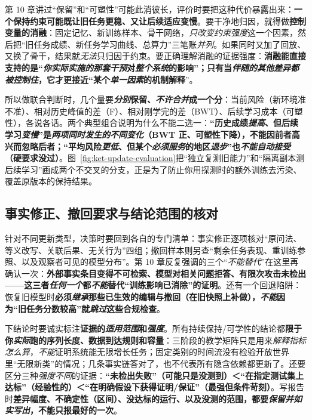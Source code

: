 第 10 章讲过“保留”和“可塑性”可能此消彼长，评价时要把这种代价暴露出来：\textbf{一个保持约束可能既让旧任务更稳、又让后续适应变慢}。要干净地归因，就得做\textbf{控制变量的消融}：固定记忆、新训练样本、骨干网络，\emph{只改变约束强度}这一个因素，然后把“旧任务成绩、新任务学习曲线、总算力”三笔账\emph{并列}。如果同时又加了回放、又换了骨干，结果就\emph{无法}只归因于约束。要正确理解消融的证据强度：\textbf{消融能直接支持的是“\emph{你\emph{实际实施}的那套干预}对\emph{整个系统}的影响”；只有当\emph{伴随的其他差异都被控制住}，它才更接近“某个\emph{单一因素}的机制解释}”。

所以做联合判断时，几个量要\textbf{\emph{分别}保留、\emph{不许合并}成一个分}：当前风险（新环境准不准）、相对历史峰值的差（F）、相对刚学完的差（BWT）、后续学习成本（可塑性），各说各话。两个典型组合说明为什么不能二选一：\textbf{“历史成绩\emph{提高}、但后续学习\emph{变慢}”是\emph{两项\emph{同时发生}的不同变化}（BWT 正、可塑性下降），不能因前者高兴而忽略后者；“平均风险\emph{更低}、但某个\emph{必须服务}的地区\emph{退步}”也\emph{不能自动接受}（硬要求没过）}。图~\ref{fig:ket-update-evaluation}把“独立复测旧能力”和“隔离副本测后续学习”画成两个不交叉的分支，正是为了防止你用探测时的额外训练去污染、覆盖原版本的保持结果。

\subsection{事实修正、撤回要求与结论范围的核对}
\label{sec:ket-evolution-evaluation-decisions}

针对不同更新类型，决策时要回到各自的专门清单：事实修正逐项核对“原问法、等义改写、关联后果、无关行为”四组；撤回样本则另查“剩余任务表现、重训练参照、以及观察者可见的模型分布”。第 10 章反复强调的三个“\emph{不能替代}”在这里再确认一次：\textbf{外部事实条目变得不可检索、模型对相关问题拒答、有限次攻击未检出——这三者\emph{任何一个}都\emph{不能}替代“训练影响已消除”的证明}。还有一个回退陷阱：恢复旧模型时\textbf{必须\emph{继承}那些已生效的编辑与撤回（在旧快照上补做），\emph{不能}因为“旧任务分数较高”就\emph{跳过}这些合规检查}。

下结论时要诚实标注\textbf{证据的\emph{适用范围}和\emph{强度}}。所有持续保持/可学性的结论都\textbf{限于你\emph{实际}跑的序列长度、数据到达规则和容量}：三阶段的教学矩阵只是用来\emph{解释指标怎么算}，\emph{不能}证明系统能无限增长任务；固定类别的时间流没有检验开放世界里“无限新类”的情况；几条事实链答对了，也不代表所有隐含依赖都更新了。还要区分三种\emph{强度不同}的证据：\textbf{“未检出失败”（可能只是没测到）＜“在指定测试集上达标”（经验性的）＜“在明确假设下获得证明/保证”（最强但条件苛刻）}。写报告时\textbf{差异幅度、不确定性（区间）、没达标的运行、以及没测的范围，都要\emph{保留并如实写出}，不能只报最好的一次}。

